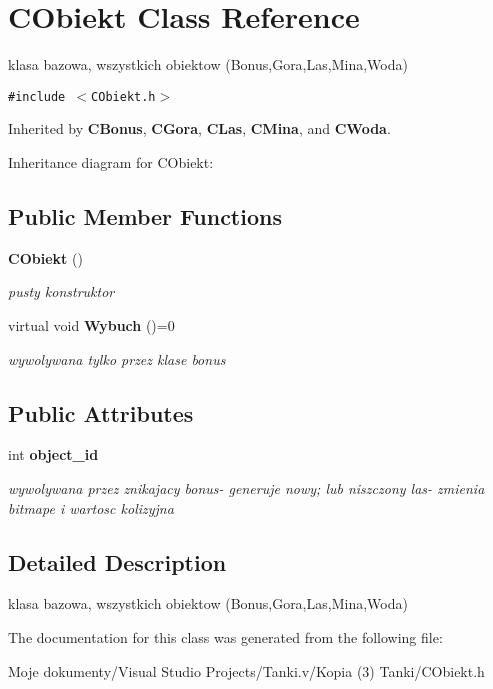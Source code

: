 \section{CObiekt Class Reference}
\label{class_c_obiekt}
klasa bazowa, wszystkich obiektow (Bonus,Gora,Las,Mina,Woda)  


{\tt \#include $<$CObiekt.h$>$}

Inherited by {\bf CBonus}, {\bf CGora}, {\bf CLas}, {\bf CMina}, and {\bf CWoda}.

Inheritance diagram for CObiekt:\subsection*{Public Member Functions}
\begin{CompactItemize}
\item 
{\bf CObiekt} ()\label{class_c_obiekt_a1a5183f5ee5e56c066679fb37576627}

\begin{CompactList}\small\item\em pusty konstruktor \item\end{CompactList}\item 
virtual void {\bf Wybuch} ()=0\label{class_c_obiekt_8200c1db0c361426ef7377d598965536}

\begin{CompactList}\small\item\em wywolywana tylko przez klase bonus \item\end{CompactList}\end{CompactItemize}
\subsection*{Public Attributes}
\begin{CompactItemize}
\item 
int {\bf object\_\-id}\label{class_c_obiekt_fdac94d71b407802e174aaeb82ea0618}

\begin{CompactList}\small\item\em wywolywana przez znikajacy bonus- generuje nowy; lub niszczony las- zmienia bitmape i wartosc kolizyjna \item\end{CompactList}\end{CompactItemize}


\subsection{Detailed Description}
klasa bazowa, wszystkich obiektow (Bonus,Gora,Las,Mina,Woda) 



The documentation for this class was generated from the following file:\begin{CompactItemize}
\item 
Moje dokumenty/Visual Studio Projects/Tanki.v/Kopia (3) Tanki/CObiekt.h\end{CompactItemize}
